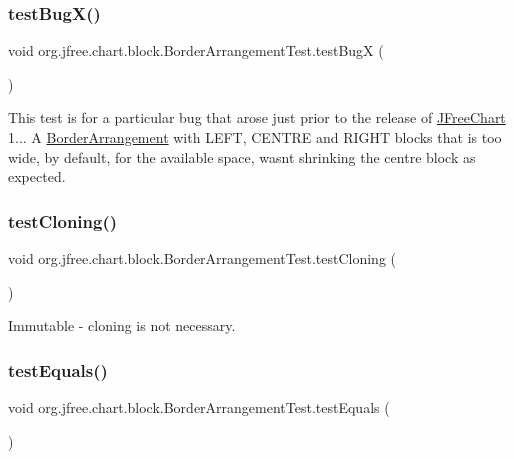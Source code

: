 \subsubsection{\texorpdfstring{test\+Bug\+X()}{testBugX()}}
{\footnotesize\ttfamily void org.\+jfree.\+chart.\+block.\+Border\+Arrangement\+Test.\+test\+BugX (\begin{DoxyParamCaption}{ }\end{DoxyParamCaption})}

This test is for a particular bug that arose just prior to the release of \mbox{\hyperlink{classorg_1_1jfree_1_1chart_1_1_j_free_chart}{J\+Free\+Chart}} 1... A \mbox{\hyperlink{classorg_1_1jfree_1_1chart_1_1block_1_1_border_arrangement}{Border\+Arrangement}} with L\+E\+FT, C\+E\+N\+T\+RE and R\+I\+G\+HT blocks that is too wide, by default, for the available space, wasn\textquotesingle{}t shrinking the centre block as expected. \mbox{\label{classorg_1_1jfree_1_1chart_1_1block_1_1_border_arrangement_test_af4c4e2346fcb67282fc30003e996bc3f}} 
\subsubsection{\texorpdfstring{test\+Cloning()}{testCloning()}}
{\footnotesize\ttfamily void org.\+jfree.\+chart.\+block.\+Border\+Arrangement\+Test.\+test\+Cloning (\begin{DoxyParamCaption}{ }\end{DoxyParamCaption})}

Immutable -\/ cloning is not necessary. \mbox{\label{classorg_1_1jfree_1_1chart_1_1block_1_1_border_arrangement_test_a11602a59db42e312c11351a9f71e3e38}} 
\subsubsection{\texorpdfstring{test\+Equals()}{testEquals()}}
{\footnotesize\ttfamily void org.\+jfree.\+chart.\+block.\+Border\+Arrangement\+Test.\+test\+Equals (\begin{DoxyParamCaption}{ }\end{DoxyParamCaption})}

